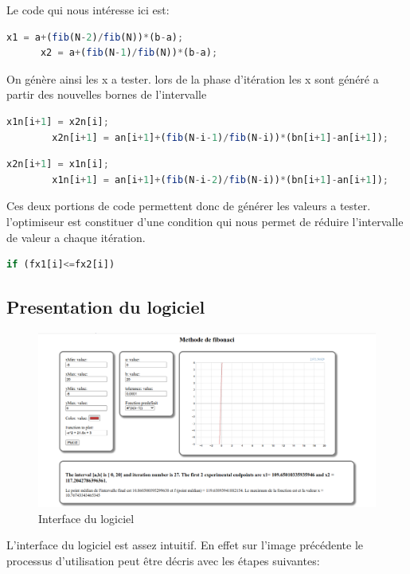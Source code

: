 \documentclass[a4paper,14pt]{article}
\begin{document}
Le code qui nous intéresse ici est:
\begin{lstlisting}[language=JavaScript]   
      x1 = a+(fib(N-2)/fib(N))*(b-a);
      x2 = a+(fib(N-1)/fib(N))*(b-a);
\end{lstlisting}

On génère ainsi les x a tester. lors de la phase d'itération les x sont généré a partir des nouvelles bornes de l'intervalle 
\begin{lstlisting}[language=JavaScript]   
        x1n[i+1] = x2n[i];
        x2n[i+1] = an[i+1]+(fib(N-i-1)/fib(N-i))*(bn[i+1]-an[i+1]);
\end{lstlisting}

\begin{lstlisting}[language=JavaScript]   
        x2n[i+1] = x1n[i];
        x1n[i+1] = an[i+1]+(fib(N-i-2)/fib(N-i))*(bn[i+1]-an[i+1]);
\end{lstlisting}

Ces deux portions de code permettent donc de générer les valeurs a tester. l'optimiseur est constituer d'une condition qui nous permet de réduire l'intervalle de valeur a chaque itération.
  
\begin{lstlisting}[language=JavaScript]   
        if (fx1[i]<=fx2[i])
\end{lstlisting}

\subsection{Presentation du logiciel}
\begin{figure}[h]
\centering
\includegraphics[width=1\textwidth, scale=1.1]{c}
\caption{Interface du logiciel}
\label{fig:figure1}
\end{figure}

L'interface du logiciel est assez intuitif. En effet sur l'image précédente le processus d'utilisation peut être décris avec les étapes suivantes:
\end{document}
